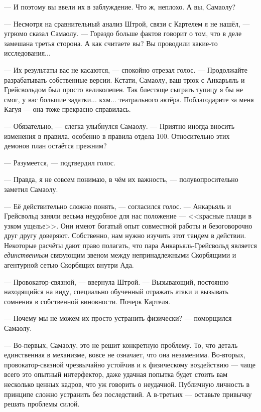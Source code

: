 --- И поэтому вы ввели их в заблуждение.
Что ж, неплохо.
А вы, Самаолу?

--- Несмотря на сравнительный анализ Штрой, связи с Картелем я не нашёл, --- угрюмо сказал Самаолу.
--- Гораздо больше фактов говорит о том, что в деле замешана третья сторона.
А как считаете вы?
Вы проводили какие-то исследования...

--- Их результаты вас не касаются, --- спокойно отрезал голос.
--- Продолжайте разрабатывать собственные версии.
Кстати, Самаолу, ваш трюк с Анкарьяль и Грейсвольдом был просто великолепен.
Так блестяще сыграть тупицу я бы не смог, у вас большие задатки... кхм... театрального актёра.
Поблагодарите за меня Кагуя --- она тоже прекрасно справилась.

--- Обязательно, --- слегка улыбнулся Самаолу.
--- Приятно иногда вносить изменения в правила, особенно в правила отдела 100.
Относительно этих демонов план остаётся прежним?

--- Разумеется, --- подтвердил голос.

--- Правда, я не совсем понимаю, в чём их важность, --- полувопросительно заметил Самаолу.

--- Её действительно сложно понять, --- согласился голос.
--- Анкарьяль и Грейсвольд заняли весьма неудобное для нас положение --- <<красные плащи в узком ущелье>>\FM.
Они имеют богатый опыт совместной работы и безоговорочно друг другу доверяют.
Собственно, нам нужно изучить этот тандем в действии.
Некоторые расчёты дают право полагать, что пара Анкарьяль-Грейсвольд является \emph{единственным} связующим звеном между непринадлежными Скорбящими и агентурной сетью Скорбящих внутри Ада.

--- Провокатор-связной, --- ввернула Штрой.
--- Вызывающий, постоянно находящийся на виду, специально обученный отражать атаки и вызывать сомнения в собственной виновности.
Почерк Картеля.

--- Почему мы не можем их просто устранить физически? --- поморщился Самаолу.

--- Во-первых, Самаолу, это не решит конкретную проблему.
То, что деталь единственная в механизме, вовсе не означает, что она незаменима.
Во-вторых, провокатор-связной чрезвычайно устойчив и к физическому воздействию --- чаще всего это опытный интерфектор, даже удачная попытка будет стоить вам несколько ценных кадров, что уж говорить о неудачной.
Публичную личность в принципе сложно устранить без последствий.
А в-третьих --- оставьте привычку решать проблемы силой.

